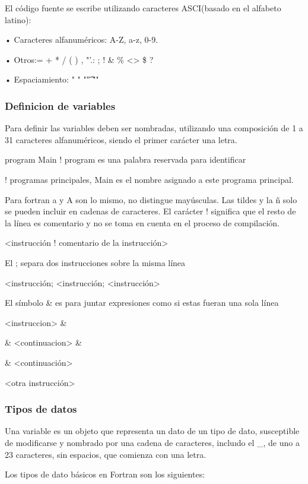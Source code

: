 El código fuente se escribe utilizando caracteres ASCI(basado en el alfabeto latino):

    • Caracteres alfanuméricos: A-Z, a-z, 0-9.
    
    • Otros:= + * / ( ) , "’.: ; ! \& \% <> \$ ?
    
    • Espaciamiento: " " "\t" "\n"

\subsubsection{Definicion de variables}

Para definir las  variables deben ser nombradas, utilizando una composición de 1 a 31 caracteres alfanuméricos, siendo el primer carácter una letra.

program Main	! program es una palabra reservada para identificar

! programas principales, Main es el nombre asignado a este programa principal.

Para fortran a y A son lo mismo, no distingue mayúsculas. Las tildes y la ñ solo se pueden incluir en cadenas de caracteres.
El carácter ! significa que el resto de la línea es comentario y no se toma en cuenta en el proceso de compilación.

<instrucción ! comentario de la instrucción>

El ; separa dos instrucciones sobre la misma línea

	<instrucción; <instrucción; <instrucción>
	
El símbolo & es para juntar expresiones como si estas fueran una sola línea 

	<instruccion> \&
	
\& <continuacion> \&

\& <continuación>

<otra instrucción>

\subsubsection{Tipos de datos}

Una variable es un objeto que representa un dato de un tipo de dato, susceptible de modificarse y nombrado por una cadena de caracteres, incluıdo el _, de uno a 23 caracteres, sin espacios, que comienza con una letra.

Los tipos de dato básicos en Fortran son los siguientes:

